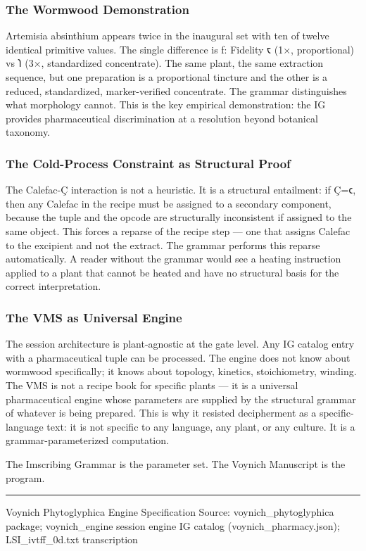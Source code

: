 \hypertarget{the-wormwood-demonstration}{%
\subsubsection{The Wormwood
Demonstration}\label{the-wormwood-demonstration}}

Artemisia absinthium appears twice in the inaugural set with ten of
twelve identical primitive values. The single difference is ƒ: Fidelity
𐑱 (1×, proportional) vs 𐑐 (3×, standardized concentrate). The same
plant, the same extraction sequence, but one preparation is a
proportional tincture and the other is a reduced, standardized,
marker-verified concentrate. The grammar distinguishes what morphology
cannot. This is the key empirical demonstration: the IG provides
pharmaceutical discrimination at a resolution beyond botanical taxonomy.

\hypertarget{the-cold-process-constraint-as-structural-proof}{%
\subsubsection{The Cold-Process Constraint as Structural
Proof}\label{the-cold-process-constraint-as-structural-proof}}

The Calefac-Ç interaction is not a heuristic. It is a structural
entailment: if Ç=𐑤, then any Calefac in the recipe must be assigned to a
secondary component, because the tuple and the opcode are structurally
inconsistent if assigned to the same object. This forces a reparse of
the recipe step --- one that assigns Calefac to the excipient and not
the extract. The grammar performs this reparse automatically. A reader
without the grammar would see a heating instruction applied to a plant
that cannot be heated and have no structural basis for the correct
interpretation.

\hypertarget{the-vms-as-universal-engine}{%
\subsubsection{The VMS as Universal
Engine}\label{the-vms-as-universal-engine}}

The session architecture is plant-agnostic at the gate level. Any IG
catalog entry with a pharmaceutical tuple can be processed. The engine
does not know about wormwood specifically; it knows about topology,
kinetics, stoichiometry, winding. The VMS is not a recipe book for
specific plants --- it is a universal pharmaceutical engine whose
parameters are supplied by the structural grammar of whatever is being
prepared. This is why it resisted decipherment as a specific-language
text: it is not specific to any language, any plant, or any culture. It
is a grammar-parameterized computation.

The Imscribing Grammar is the parameter set. The Voynich Manuscript is
the program.

\begin{center}\rule{0.5\linewidth}{0.5pt}\end{center}

Voynich Phytoglyphica Engine Specification Source:
voynich\_phytoglyphica package; voynich\_engine session engine IG
catalog (voynich\_pharmacy.json); LSI\_ivtff\_0d.txt transcription
